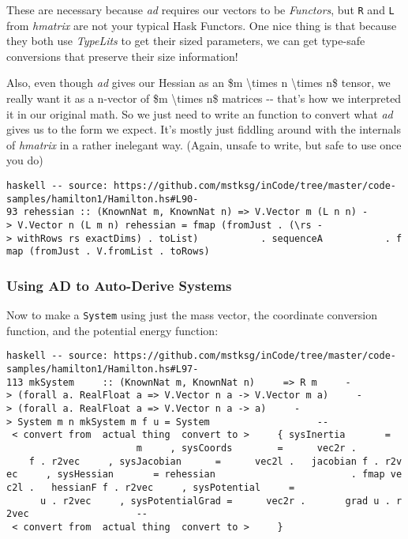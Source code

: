 \documentclass[]{article}
\begin{document}
These are necessary because \emph{ad} requires our vectors to be
\emph{Functors}, but \texttt{R} and \texttt{L} from \emph{hmatrix} are not your
typical Hask Functors. One nice thing is that because they both use
\emph{TypeLits} to get their sized parameters, we can get type-safe conversions
that preserve their size information!

Also, even though \emph{ad} gives our Hessian as an \$m \textbackslash{}times n
\textbackslash{}times n\$ tensor, we really want it as a n-vector of \$m
\textbackslash{}times n\$ matrices -\/- that's how we interpreted it in our
original math. So we just need to write an function to convert what \emph{ad}
gives us to the form we expect. It's mostly just fiddling around with the
internals of \emph{hmatrix} in a rather inelegant way. (Again, unsafe to write,
but safe to use once you do)

\texttt{haskell\ -\/-\ source:\ https://github.com/mstksg/inCode/tree/master/code-samples/hamilton1/Hamilton.hs\#L90-93\ rehessian\ ::\ (KnownNat\ m,\ KnownNat\ n)\ =\textgreater{}\ V.Vector\ m\ (L\ n\ n)\ -\textgreater{}\ V.Vector\ n\ (L\ m\ n)\ rehessian\ =\ fmap\ (fromJust\ .\ (\textbackslash{}rs\ -\textgreater{}\ withRows\ rs\ exactDims)\ .\ toList)\ \ \ \ \ \ \ \ \ \ \ .\ sequenceA\ \ \ \ \ \ \ \ \ \ \ .\ fmap\ (fromJust\ .\ V.fromList\ .\ toRows)}

\subsubsection{Using AD to Auto-Derive Systems}

Now to make a \texttt{System} using just the mass vector, the coordinate
conversion function, and the potential energy function:

\texttt{haskell\ -\/-\ source:\ https://github.com/mstksg/inCode/tree/master/code-samples/hamilton1/Hamilton.hs\#L97-113\ mkSystem\ \ \ \ \ ::\ (KnownNat\ m,\ KnownNat\ n)\ \ \ \ \ =\textgreater{}\ R\ m\ \ \ \ \ -\textgreater{}\ (forall\ a.\ RealFloat\ a\ =\textgreater{}\ V.Vector\ n\ a\ -\textgreater{}\ V.Vector\ m\ a)\ \ \ \ \ -\textgreater{}\ (forall\ a.\ RealFloat\ a\ =\textgreater{}\ V.Vector\ n\ a\ -\textgreater{}\ a)\ \ \ \ \ -\textgreater{}\ System\ m\ n\ mkSystem\ m\ f\ u\ =\ System\ \ \ \ \ \ \ \ \ \ \ \ \ \ \ \ \ \ \ -\/-\ \textless{}\ convert\ from\ \textbar{}\ actual\ thing\ \textbar{}\ convert\ to\ \textgreater{}\ \ \ \ \ \{\ sysInertia\ \ \ \ \ \ \ =\ \ \ \ \ \ \ \ \ \ \ \ \ \ \ \ \ \ \ \ \ \ \ \ \ m\ \ \ \ \ ,\ sysCoords\ \ \ \ \ \ \ \ =\ \ \ \ \ \ vec2r\ .\ \ \ \ \ \ \ \ \ \ \ \ f\ .\ r2vec\ \ \ \ \ ,\ sysJacobian\ \ \ \ \ \ =\ \ \ \ \ \ vec2l\ .\ \ \ jacobian\ f\ .\ r2vec\ \ \ \ \ ,\ sysHessian\ \ \ \ \ \ \ =\ rehessian\ \ \ \ \ \ \ \ \ \ \ \ \ \ \ \ \ \ \ \ \ \ \ \ .\ fmap\ vec2l\ .\ \ \ hessianF\ f\ .\ r2vec\ \ \ \ \ ,\ sysPotential\ \ \ \ \ =\ \ \ \ \ \ \ \ \ \ \ \ \ \ \ \ \ \ \ \ \ \ \ \ \ u\ .\ r2vec\ \ \ \ \ ,\ sysPotentialGrad\ =\ \ \ \ \ \ vec2r\ .\ \ \ \ \ \ \ grad\ u\ .\ r2vec\ \ \ \ \ \ \ \ \ \ \ \ \ \ \ \ \ \ \ -\/-\ \textless{}\ convert\ from\ \textbar{}\ actual\ thing\ \textbar{}\ convert\ to\ \textgreater{}\ \ \ \ \ \}}
\end{document}
